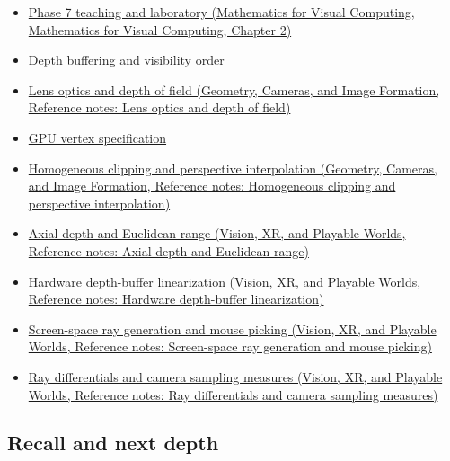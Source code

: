 \begin{itemize}
\item
  \href{../02-Mathematics-for-Visual-Computing/main.pdf\#nameddest=01-foundations-i-ch018-keep-the-promises-visible-while-moving-between-representations}{Phase 7 teaching and laboratory (Mathematics for Visual Computing, Mathematics for Visual Computing, Chapter 2)}
\item
  \hyperref[appendix-97578ed97952]{Depth buffering and visibility order}
\item
  \href{../03-Geometry-Cameras-and-Image-Formation/main.pdf\#nameddest=appendix-21f8456e2629}{Lens optics and depth of field (Geometry, Cameras, and Image Formation, Reference notes: Lens optics and depth of field)}
\item
  \hyperref[appendix-749ba51a6c25]{GPU vertex specification}
\item
  \href{../03-Geometry-Cameras-and-Image-Formation/main.pdf\#nameddest=appendix-40426e4b2103}{Homogeneous clipping and perspective interpolation (Geometry, Cameras, and Image Formation, Reference notes: Homogeneous clipping and perspective interpolation)}
\item
  \href{../07-Vision-XR-and-Playable-Worlds/main.pdf\#nameddest=appendix-cac01ebeeb11}{Axial depth and Euclidean range (Vision, XR, and Playable Worlds, Reference notes: Axial depth and Euclidean range)}
\item
  \href{../07-Vision-XR-and-Playable-Worlds/main.pdf\#nameddest=appendix-1bc40b08db4a}{Hardware depth-buffer linearization (Vision, XR, and Playable Worlds, Reference notes: Hardware depth-buffer linearization)}
\item
  \href{../07-Vision-XR-and-Playable-Worlds/main.pdf\#nameddest=appendix-f1a6d43e80d1}{Screen-space ray generation and mouse picking (Vision, XR, and Playable Worlds, Reference notes: Screen-space ray generation and mouse picking)}
\item
  \href{../07-Vision-XR-and-Playable-Worlds/main.pdf\#nameddest=appendix-8c40fad29462}{Ray differentials and camera sampling measures (Vision, XR, and Playable Worlds, Reference notes: Ray differentials and camera sampling measures)}
\end{itemize}

\subsection{Recall and next depth}\label{appendix-1c07d64f5e70-recall-and-next-depth}

